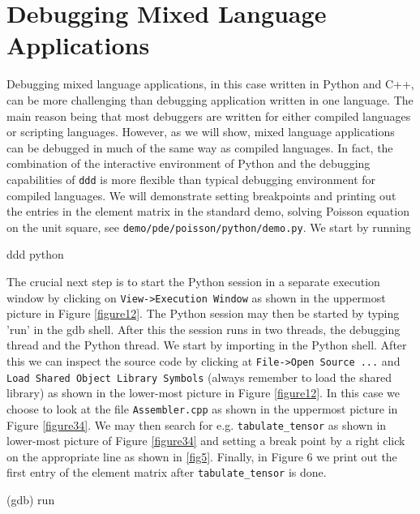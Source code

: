 \section{Debugging Mixed Language Applications}
Debugging mixed language applications, in this case written in
Python and C++, can be more challenging than debugging application
written in one language. The main reason being that most debuggers are written
for either compiled languages or scripting languages. However, as
we will show, mixed language applications can be debugged in much of the same way
as compiled languages. In fact, the combination of the interactive environment
of Python and the debugging capabilities of \texttt{ddd} is more flexible than typical
debugging environment for compiled languages. We will demonstrate setting breakpoints and
printing out the entries in the element matrix in the standard \dolfin demo,
solving Poisson equation on the unit square, see \texttt{demo/pde/}\texttt{poisson/python/}\texttt{demo.py}. We start by running
\begin{c++}
ddd python
\end{c++}
The crucial next step is to start the Python session in a separate execution window by clicking on \texttt{View->Execution Window} as shown in the uppermost picture in  Figure \ref{figure12}.
The Python session may then be started by typing 'run' in the gdb shell.
After this the session runs in two threads, the debugging thread and the
Python thread. We start by importing \dolfin in the Python shell. After this we can inspect the \dolfin source code by clicking at \texttt{File->Open Source ...} and \texttt{Load Shared Object Library Symbols} (always remember to load the shared library) as shown in the lower-most picture in Figure \ref{figure12}. In this case we choose to look at the file \texttt{Assembler.cpp} as shown in the uppermost picture in Figure \ref{figure34}. We may then search for e.g. \texttt{tabulate\_tensor} as shown in lower-most picture of Figure \ref{figure34} and
setting a break point by a right click on the appropriate line as shown in \ref{fig5}. Finally, in Figure 6
we print out the first entry of the element matrix after \texttt{tabulate\_tensor} is done.
\begin{c++}
(gdb) run
\end{c++}
